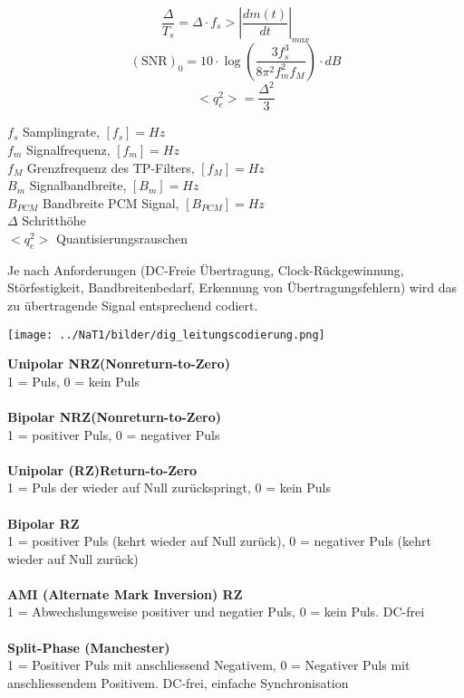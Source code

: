 \begin{minipage}{9cm}
$$ \frac{\Delta}{T_s} = \Delta \cdot f_s > \left| \frac{d m(t)}{dt} \right|_{max}$$
$$ (\text{SNR})_0 = 10 \cdot \log\left(\frac{3 f_s^3}{8 \pi^2 f_m^2 f_M}\right) \cdot dB$$ 
$$ <q_e^2> = \frac{\Delta^2}{3} $$ 
\end{minipage}
\begin{minipage}{9cm}
	$f_s$ Samplingrate, $[f_s] = Hz$ \\
	$f_m$ Signalfrequenz, $[f_m] = Hz$ \\
	$f_M$ Grenzfrequenz des TP-Filters, $[f_M] = Hz$ \\
	$B_m$ Signalbandbreite, $[B_m] = Hz $ \\
	$B_{PCM}$ Bandbreite PCM Signal, $[B_{PCM}] = Hz $\\
	$\Delta$ Schritthöhe\\
	$<q_e^2>$ Quantisierungsrauschen \\
	
\end{minipage}

Je nach Anforderungen (DC-Freie Übertragung, Clock-Rückgewinnung, Störfestigkeit,
Bandbreitenbedarf, Erkennung von Übertragungsfehlern) wird das zu übertragende Signal entsprechend
codiert.

\begin{minipage}{9cm}
	\texttt{[image: ../NaT1/bilder/dig\_leitungscodierung.png]}
\end{minipage}
\begin{minipage}{9cm}
	\textbf{Unipolar NRZ(Nonreturn-to-Zero)} \\
	1 = Puls, 0 = kein Puls \\ \\
	\textbf{Bipolar NRZ(Nonreturn-to-Zero)} \\
	1 = positiver Puls, 0 = negativer Puls \\ \\
	\textbf{Unipolar (RZ)Return-to-Zero} \\
	1 = Puls der wieder auf Null zurückspringt, 0 = kein Puls \\ \\
	\textbf{Bipolar RZ} \\
	1 = positiver Puls (kehrt wieder auf Null zurück), 0 = negativer Puls (kehrt wieder auf Null
	zurück)\\ \\
	\textbf{AMI (Alternate Mark Inversion) RZ} \\
	1 = Abwechslungsweise positiver und negatier Puls, 0 = kein Puls. DC-frei\\ \\
	\textbf{Split-Phase (Manchester)} \\
	1 = Positiver Puls mit anschliessend Negativem, 0 = Negativer Puls mit anschliessendem Positivem. DC-frei, einfache Synchronisation
\end{minipage}

